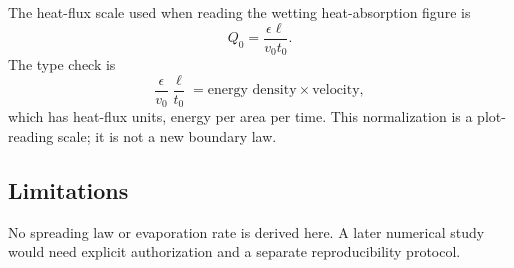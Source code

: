 The heat-flux scale used when reading the wetting heat-absorption figure is
\begin{equation}
  Q_0=\frac{\epsilon\ell}{v_0t_0}.
  \label{eq:iii-wetting-heat-flux-normalization}
\end{equation}
The type check is
\begin{equation}
  \frac{\epsilon}{v_0}\frac{\ell}{t_0}
  =\text{energy density}\times\text{velocity},
\end{equation}
which has heat-flux units, energy per area per time.  This normalization is a
plot-reading scale; it is not a new boundary law.

\subsection*{Limitations}

No spreading law or evaporation rate is derived here.  A later numerical study
would need explicit authorization and a separate reproducibility protocol.
